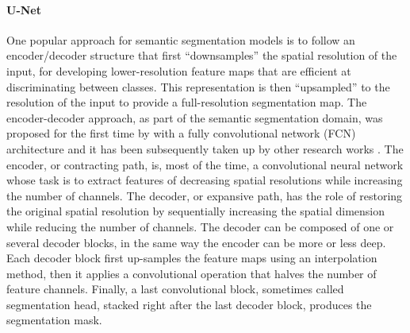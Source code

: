 \paragraph{U-Net} \label{U-Net}

One popular approach for semantic segmentation models is to follow an encoder/decoder structure that first “downsamples” the spatial resolution of the input, for developing lower-resolution feature maps that are efficient at discriminating between classes. This representation is then “upsampled” to the resolution of the input to provide a full-resolution segmentation map. The encoder-decoder approach, as part of the semantic segmentation domain, was proposed for the first time by \citet{long2015fully} with a fully convolutional network (FCN) architecture and it has been subsequently taken up by other research works \citep{ronneberger2015u,zhao2017pyramid,chen2017rethinking,chen2018encoder,badrinarayanan2017segnet}. The encoder, or contracting path, is, most of the time, a convolutional neural network whose task is to extract features of decreasing spatial resolutions while increasing the number of channels.
The decoder, or expansive path, has the role of restoring the original spatial resolution by sequentially increasing the spatial dimension while reducing the number of channels. The decoder can be composed of one or several decoder blocks, in the same way the encoder can be more or less deep. Each decoder block first up-samples the feature maps using an interpolation method, then it applies a convolutional operation that halves the number of feature channels. Finally, a last convolutional block, sometimes called segmentation head, stacked right after the last decoder block, produces the segmentation mask. 


